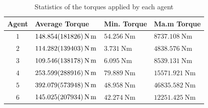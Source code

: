 \begin{table}[ht]
    \centering
    \caption{Statistics of the torques applied by each agent}\label{tb:torques}
    \begin{tabular}{clll}
    Agent & Average Torque & Min. Torque & Ma.m Torque\\\hline
    $1$ & $\qty{148.854 \pm 181.826}{\newton\meter}$ & $\qty{54.256}{\newton\meter}$ & $\qty{8737.108}{\newton\meter}$\\
    $2$ & $\qty{114.282 \pm 139.403}{\newton\meter}$ & $\qty{3.731}{\newton\meter}$ & $\qty{4838.576}{\newton\meter}$\\
    $3$ & $\qty{109.546 \pm 138.178}{\newton\meter}$ & $\qty{6.095}{\newton\meter}$ & $\qty{8539.131}{\newton\meter}$\\
    $4$ & $\qty{253.599 \pm 288.916}{\newton\meter}$ & $\qty{79.889}{\newton\meter}$ & $\qty{15571.921}{\newton\meter}$\\
    $5$ & $\qty{392.079 \pm 573.948}{\newton\meter}$ & $\qty{48.958}{\newton\meter}$ & $\qty{46835.582}{\newton\meter}$\\
    $6$ & $\qty{145.025 \pm 207.934}{\newton\meter}$ & $\qty{42.274}{\newton\meter}$ & $\qty{12251.425}{\newton\meter}$
    \\\hline
    \end{tabular}
\end{table}